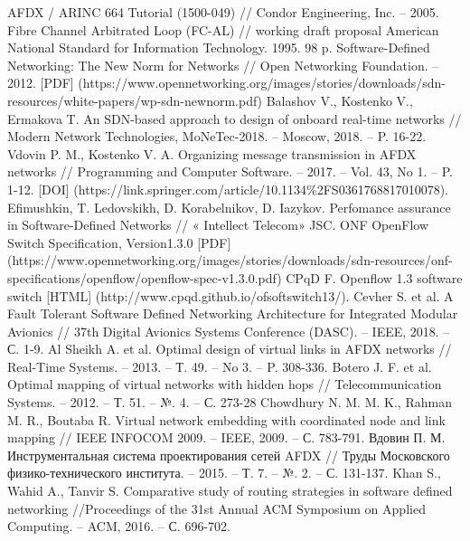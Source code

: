 \documentclass[12pt, a4paper]{article}
\begin{document}
\renewcommand{\bibname}{Список литературы}
\addcontentsline{toc}{section}{\bibname}

\begin{thebibliography}{}
	AFDX / ARINC 664 Tutorial (1500-049) // Condor Engineering, Inc. -- 2005.
	Fibre Channel Arbitrated Loop (FC-AL) // working draft proposal American National Standard for Information Technology. 1995. 98 p.
	Software-Defined Networking: The New Norm for Networks // Open Networking Foundation. -- 2012. [PDF] (https://www.opennetworking.org/images/stories/downloads/sdn-resources/white-papers/wp-sdn-newnorm.pdf)
	Balashov V., Kostenko V., Ermakova T. An SDN-based approach to design of onboard real-time networks // Modern Network Technologies, MoNeTec-2018. -- Moscow, 2018. -- P. 16-22.
	Vdovin P. M., Kostenko V. A. Organizing message transmission in AFDX networks // Programming and Computer Software. -- 2017. -- Vol. 43, No 1. -- P. 1-12. [DOI] (https://link.springer.com/article/10.1134\%2FS0361768817010078).
	Efimushkin, T. Ledovskikh, D. Korabelnikov, D. Iazykov. Perfomance assurance in Software-Defined Networks // « Intellect Telecom» JSC.
	ONF OpenFlow Switch Specification, Version1.3.0 [PDF] (https://www.opennetworking.org/images/stories/downloads/sdn-resources/onf-specifications/openflow/openflow-spec-v1.3.0.pdf)
	CPqD F. Openflow 1.3 software switch [HTML] (http://www.cpqd.github.io/ofsoftswitch13/).
	Cevher S. et al. A Fault Tolerant Software Defined Networking Architecture for Integrated Modular Avionics // 37th Digital Avionics Systems Conference (DASC). -- IEEE, 2018. -- С. 1-9.
	Al Sheikh A. et al. Optimal design of virtual links in AFDX networks // Real-Time Systems. -- 2013. -- Т. 49. -- No 3. -- P. 308-336.
	Botero J. F. et al. Optimal mapping of virtual networks with hidden hops // Telecommunication Systems. -- 2012. -- Т. 51. -- №. 4. -- С. 273-28
	Chowdhury N. M. M. K., Rahman M. R., Boutaba R. Virtual network embedding with coordinated node and link mapping // IEEE INFOCOM 2009. -- IEEE, 2009. -- С. 783-791.
	Вдовин П. М. Инструментальная система проектирования сетей AFDX // Труды Московского физико-технического института. -- 2015. -- Т. 7. -- №. 2. -- С. 131-137.
	Khan S., Wahid A., Tanvir S. Comparative study of routing strategies in software defined networking //Proceedings of the 31st Annual ACM Symposium on Applied Computing. -- ACM, 2016. -- С. 696-702.

\end{thebibliography}
\end{document}
